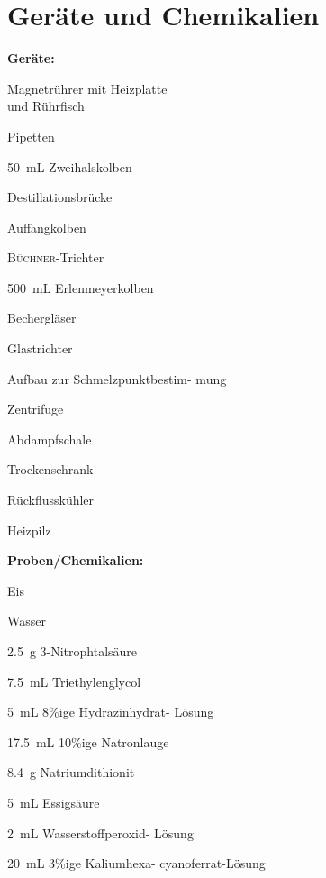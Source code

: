 \section{Geräte und Chemikalien}
\label{sec:geraete}

\textbf{Geräte:}
\begin{itemize}
	\begin{minipage}{0.45\textwidth}
		\item Magnetrührer mit Heizplatte \\ und Rührfisch
		\item Pipetten
		\item \SI{50}{\milli \liter}-Zweihalskolben
		\item Destillationsbrücke
		\item Auffangkolben
		\item \textsc{Büchner}-Trichter
		\item \SI{500}{\milli \liter} Erlenmeyerkolben
		\item Bechergläser
	\end{minipage}
	\hfill
	\begin{minipage}{0.45\textwidth}
		\item Glastrichter
		\item Aufbau zur Schmelzpunktbestim- mung
		\item Zentrifuge
		\item Abdampfschale
		\item Trockenschrank
		\item Rückflusskühler
		\item Heizpilz
	\end{minipage}
\end{itemize}

\newpage

\textbf{Proben/Chemikalien:}
\begin{itemize}
	\begin{minipage}{0.42 \textwidth}
		\item Eis
		\item Wasser
		\item \SI{2,5}{\gram} 3-Nitrophtalsäure
		\item \SI{7,5}{\milli \liter} Triethylenglycol
		\item \SI{5}{\milli \liter} 8\%ige Hydrazinhydrat- \mbox{Lösung}
	\end{minipage}
\hfill
\begin{minipage}{0.42 \textwidth}
		\item \SI{17,5}{\milli \liter} 10\%ige Natronlauge
		\item \SI{8,4}{\gram} Natriumdithionit
		\item \SI{5}{\milli \liter} Essigsäure
		\item \SI{2}{\milli \liter} Wasserstoffperoxid- Lösung
		\item \SI{20}{\milli \liter} 3\%ige Kaliumhexa- cyanoferrat-Lösung
\end{minipage}
\end{itemize}



